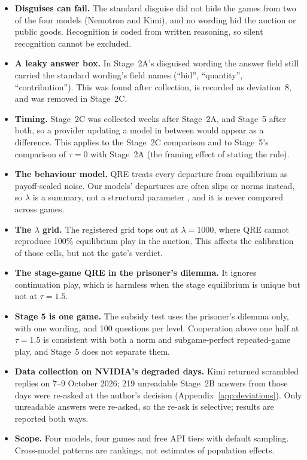 \documentclass[11pt]{article}
\theoremstyle{definition}
\theoremstyle{remark}
\newcommand{\lam}{\lambda}
\begin{document}
\begin{itemize}
\item \textbf{Disguises can fail.} The standard disguise did not hide the games from two of the four
  models (Nemotron and Kimi), and no wording hid the auction or public goods. Recognition is coded from written
  reasoning, so silent recognition cannot be excluded.
\item \textbf{A leaky answer box.} In Stage~2A's disguised wording the answer field still carried
  the standard wording's field names (``bid'', ``quantity'', ``contribution''). This was found after
  collection, is recorded as deviation~8, and was removed in Stage~2C.
\item \textbf{Timing.} Stage~2C was collected weeks after Stage~2A, and Stage~5 after both, so a
  provider updating a model in between would appear as a difference. This applies to the
  Stage~2C comparison and to Stage~5's comparison of $\tau=0$ with Stage~2A (the framing
  effect of stating the rule).
\item \textbf{The behaviour model.} QRE treats every departure from equilibrium as payoff-scaled
  noise. Our models' departures are often slips or norms instead, so $\lam$ is a summary, not a
  structural parameter \citep{pechon2026auditing}, and it is never compared across games.
\item \textbf{The $\lam$ grid.} The registered grid tops out at $\lam = 1000$, where QRE cannot
  reproduce 100\% equilibrium play in the auction. This affects the calibration of those cells,
  but not the gate's verdict.
\item \textbf{The stage-game QRE in the prisoner's dilemma.} It ignores continuation play, which
  is harmless when the stage equilibrium is unique but not at $\tau=1.5$.
\item \textbf{Stage 5 is one game.} The subsidy test uses the prisoner's dilemma only, with one
  wording, and 100 questions per level. Cooperation above one half at $\tau=1.5$ is consistent
  with both a norm and subgame-perfect repeated-game play, and Stage~5 does not separate them.
\item \textbf{Data collection on NVIDIA's degraded days.} Kimi returned scrambled replies on 7--9
  October 2026; 219 unreadable Stage~2B answers from those days were re-asked at the author's
  decision (Appendix~\ref{app:deviations}). Only unreadable answers were re-asked, so the re-ask
  is selective; results are reported both ways.
\item \textbf{Scope.} Four models, four games and free API tiers with default sampling.
  Cross-model patterns are rankings, not estimates of population effects.
\end{itemize}
\end{document}
